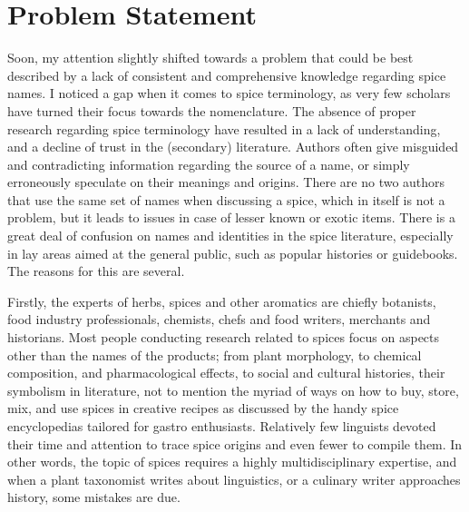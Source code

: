 \section{Problem Statement}

Soon, my attention slightly shifted towards a problem that could be best described by a lack of consistent and comprehensive knowledge regarding spice names. I noticed a gap when it comes to spice terminology, as very few scholars have turned their focus towards the nomenclature. The absence of proper research regarding spice terminology have resulted in a lack of understanding, and a decline of trust in the (secondary) literature. Authors often give misguided and contradicting information regarding the source of a name, or simply erroneously speculate on their meanings and origins. There are no two authors that use the same set of names when discussing a spice, which in itself is not a problem, but it leads to issues in case of lesser known or exotic items. There is a great deal of confusion on names and identities in the spice literature, especially in lay areas aimed at the general public, such as popular histories or guidebooks. The reasons for this are several.

Firstly, the experts of herbs, spices and other aromatics are chiefly botanists, food industry professionals, chemists, chefs and food writers, merchants and historians. Most people conducting research related to spices focus on aspects other than the names of the products; from plant morphology, to chemical composition, and pharmacological effects, to social and cultural histories, their symbolism in literature, not to mention the myriad of ways on how to buy, store, mix, and use spices in creative recipes as discussed by the handy spice encyclopedias tailored for gastro enthusiasts. Relatively few linguists devoted their time and attention to trace spice origins and even fewer to compile them. In other words, the topic of spices requires a highly multidisciplinary expertise, and when a plant taxonomist writes about linguistics, or a culinary writer approaches history, some mistakes are due.

